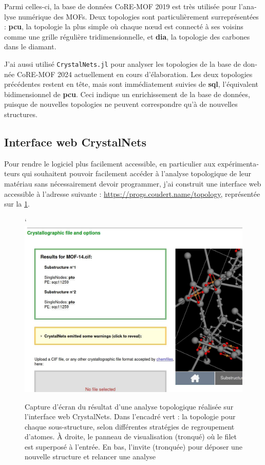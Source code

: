 \documentclass[thesis]{subfiles}
\begin{document}
\begin{otherlanguage}{french}
Parmi celles-ci, la base de données CoRE-MOF 2019 \autocite{CoREMOF2024} est très utilisée pour l'analyse numérique des MOFs. Deux topologies sont particulièrement surreprésentées : \textbf{pcu}, la topologie la plus simple où chaque n\oe ud est connecté à ses voisins comme une grille régulière tridimensionnelle, et \textbf{dia}, la topologie des carbones dans le diamant.

J'ai aussi utilisé \texttt{CrystalNets.jl} pour analyser les topologies de la base de donnée CoRE-MOF 2024 actuellement en cours d'élaboration. Les deux topologies précédentes restent en tête, mais sont immédiatement suivies de \textbf{sql}, l'équivalent bidimensionnel de \textbf{pcu}. Ceci indique un enrichissement de la base de données, puisque de nouvelles topologies ne peuvent correspondre qu'à de nouvelles structures.

\subsection{Interface web CrystalNets}

Pour rendre le logiciel plus facilement accessible, en particulier aux expérimentateurs qui souhaitent pouvoir facilement accéder à l'analyse topologique de leur matériau sans nécessairement devoir programmer, j'ai construit une interface web accessible à l'adresse suivante : \url{https://progs.coudert.name/topology}, représentée sur la \cref{fig_webcrystalnets}.

\begin{figure}[b]`
	\centering
	\includegraphics[width=0.9\linewidth]{figures/topology/WebsiteAnswer.jpg}
	\caption{Capture d'écran du résultat d'une analyse topologique réalisée sur l'interface web CrystalNets. Dans l'encadré vert : la topologie pour chaque sous-structure, selon différentes stratégies de regroupement d'atomes. À droite, le panneau de visualisation (tronqué) où le filet est superposé à l'entrée. En bas, l'invite (tronquée) pour déposer une nouvelle structure et relancer une analyse}\label{fig_webcrystalnets}
\end{figure}


\end{otherlanguage}
\end{document}
